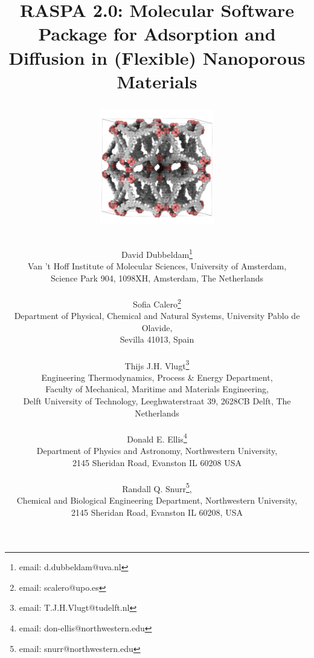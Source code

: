 \documentclass[onecolumn]{book}
\begin{document}
\title{
\vskip -3.0cm
RASPA 2.0: Molecular Software Package for Adsorption and Diffusion in (Flexible) Nanoporous Materials
\vskip 0.25cm
\begin{figure}[H]
\centering
\includegraphics[width=5cm]{NU-110.jpg}
\end{figure}}
\author{
David Dubbeldam\footnote{email: d.dubbeldam@uva.nl}\\
Van 't Hoff Institute of Molecular Sciences, University of Amsterdam,\\
Science Park 904, 1098XH, Amsterdam, The Netherlands\\\\
Sofia Calero\footnote{email: scalero@upo.es}\\
Department of Physical, Chemical and Natural Systems,
University Pablo de Olavide,\\
Sevilla 41013, Spain\\\\
Thijs J.H. Vlugt\footnote{email: T.J.H.Vlugt@tudelft.nl}\\
Engineering Thermodynamics, Process \& Energy Department,\\
Faculty of Mechanical, Maritime and Materials Engineering,\\
 Delft University of Technology, Leeghwaterstraat 39, 2628CB Delft, The Netherlands\\\\
Donald E. Ellis\footnote{email: don-ellis@northwestern.edu}\\
Department of Physics and Astronomy, Northwestern University,\\
2145 Sheridan Road, Evanston IL  60208  USA\\\\
Randall Q. Snurr\footnote{email: snurr@northwestern.edu},\\
Chemical and Biological Engineering Department, Northwestern University,\\
2145 Sheridan Road, Evanston IL  60208,  USA
}
\maketitle
\end{document}
